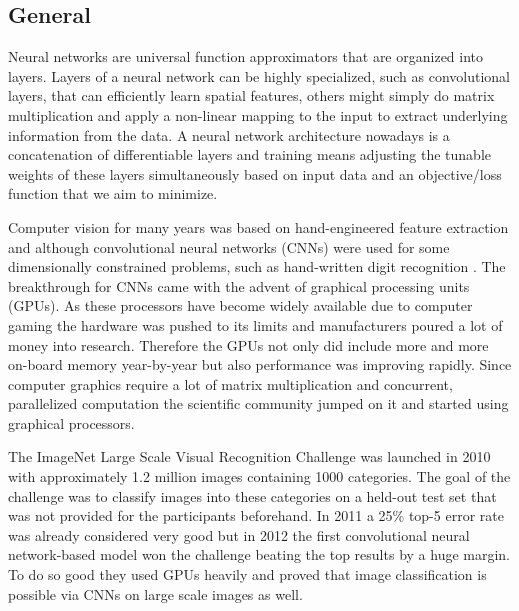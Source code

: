 \documentclass[a4paper,12pt]{article}
\begin{document}
\vspace{7mm}

\subsection{General}

\vspace{7mm}

Neural networks are universal function approximators that are organized into layers. Layers of a neural network can be highly specialized, such as convolutional layers, that can efficiently learn spatial features, others might simply do matrix multiplication and apply a non-linear mapping to the input to extract underlying information from the data. A neural network architecture nowadays is a concatenation of differentiable layers and training means adjusting the tunable weights of these layers simultaneously based on input data and an objective/loss function that we aim to minimize.

\vspace{4mm}

\par Computer vision for many years was based on hand-engineered feature extraction and although convolutional neural networks (CNNs) were used for some dimensionally constrained problems, such as hand-written digit recognition \cite{lecun1998gradient}. The breakthrough for CNNs came with the advent of graphical processing units (GPUs). As these processors have become widely available due to computer gaming the hardware was pushed to its limits and manufacturers poured a lot of money into research. Therefore the GPUs not only did include more and more on-board memory year-by-year but also performance was improving rapidly. Since computer graphics require a lot of matrix multiplication and concurrent, parallelized computation the scientific community jumped on it and started using graphical processors.

\vspace{4mm}

\par The ImageNet Large Scale Visual Recognition Challenge \cite{ILSVRC15} was launched in 2010 with approximately 1.2 million images containing 1000 categories. The goal of the challenge was to classify images into these categories on a held-out test set that was not provided for the participants beforehand. In 2011 a 25\% top-5 error rate was already considered very good but in 2012 the first convolutional neural network-based model \cite{krizhevsky2012imagenet} won the challenge beating the top results by a huge margin. To do so good they used GPUs heavily and proved that image classification is possible via CNNs on large scale images as well.
\end{document}
